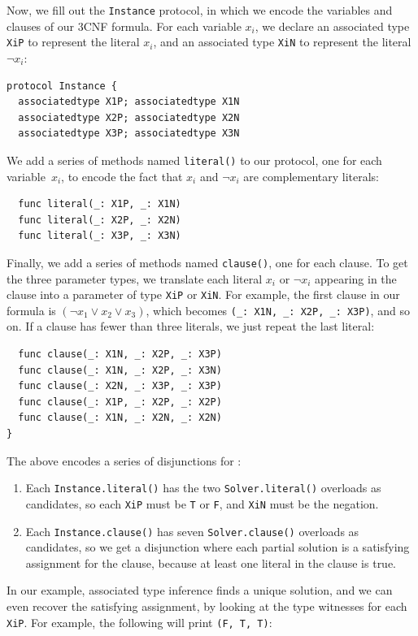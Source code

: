 \documentclass[../generics]{subfiles}
\begin{document}
Now, we fill out the \texttt{Instance} protocol, in which we encode the variables and clauses of our 3CNF formula. For each variable $x_i$, we declare an associated type \texttt{XiP} to represent the literal $x_i$, and an associated type \texttt{XiN} to represent the literal $\neg x_i$:
\begin{Verbatim}
protocol Instance {
  associatedtype X1P; associatedtype X1N
  associatedtype X2P; associatedtype X2N
  associatedtype X3P; associatedtype X3N
\end{Verbatim}
We add a series of methods named \verb|literal()| to our protocol, one for each variable~$x_i$, to encode the fact that $x_i$ and $\neg x_i$ are complementary literals:
\begin{Verbatim}
  func literal(_: X1P, _: X1N)
  func literal(_: X2P, _: X2N)
  func literal(_: X3P, _: X3N)
\end{Verbatim}
Finally, we add a series of methods named \verb|clause()|, one for each clause. To get the three parameter types, we translate each literal $x_i$ or $\neg x_i$ appearing in the clause into a parameter of type \texttt{XiP} or \texttt{XiN}. For example, the first clause in our formula is $(\neg x_1 \vee x_2 \vee x_3)$, which becomes \verb|(_: X1N, _: X2P, _: X3P)|, and so on. If a clause has fewer than three literals, we just repeat the last literal:
\begin{Verbatim}
  func clause(_: X1N, _: X2P, _: X3P)
  func clause(_: X1N, _: X2P, _: X3N)
  func clause(_: X2N, _: X3P, _: X3P)
  func clause(_: X1P, _: X2P, _: X2P)
  func clause(_: X1N, _: X2N, _: X2N)
}
\end{Verbatim}
The above encodes a series of disjunctions for :
\begin{enumerate}
\item Each \verb|Instance.literal()| has the two \verb|Solver.literal()| overloads as candidates, so each \texttt{XiP} must be \texttt{T} or \texttt{F}, and \texttt{XiN} must be the negation.
\item Each \verb|Instance.clause()| has seven \verb|Solver.clause()| overloads as candidates, so we get a disjunction where each partial solution is a satisfying assignment for the clause, because at least one literal in the clause is true.
\end{enumerate}
In our example, associated type inference finds a unique solution, and we can even recover the satisfying assignment, by looking at the type witnesses for each \texttt{XiP}. For example, the following will print \verb|(F, T, T)|:
\end{document}
